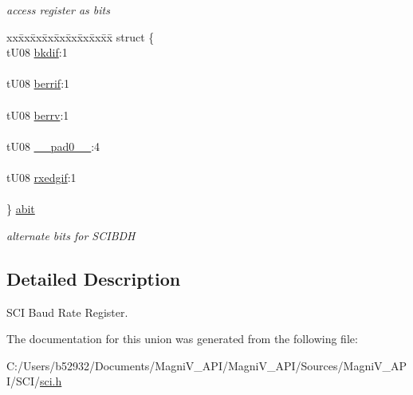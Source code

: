 \begin{DoxyCompactItemize}
\begin{tabbing}
\end{tabbing}\begin{DoxyCompactList}\small\item\em access register as bits \end{DoxyCompactList}\item 
\hypertarget{unionu_s_c_i_b_d_h_a577035baed3b5fcdcb15eea56205b567}{}\begin{tabbing}
xx\=xx\=xx\=xx\=xx\=xx\=xx\=xx\=xx\=\kill
struct \{\\
\>tU08 \hyperlink{unionu_s_c_i_b_d_h_ae49ce51a9e613e61b85a8d08e05ca972}{bkdif}:1\\
\>\\
\>tU08 \hyperlink{unionu_s_c_i_b_d_h_a31cd5bb70bc01ccdebdbfb70d4dbd71f}{berrif}:1\\
\>\\
\>tU08 \hyperlink{unionu_s_c_i_b_d_h_ad6b46bbe8d4087224f35a47a8bff6dd7}{berrv}:1\\
\>\\
\>tU08 \hyperlink{unionu_s_c_i_b_d_h_aa3e5250d311ceb1525f9adf38f0d7982}{\_\_pad0\_\_}:4\\
\>\\
\>tU08 \hyperlink{unionu_s_c_i_b_d_h_ae915416fcf85390ca0918f57902d3d84}{rxedgif}:1\\
\>\\
\} \hyperlink{unionu_s_c_i_b_d_h_a577035baed3b5fcdcb15eea56205b567}{abit}\label{unionu_s_c_i_b_d_h_a577035baed3b5fcdcb15eea56205b567}
\\

\end{tabbing}\begin{DoxyCompactList}\small\item\em alternate bits for S\+C\+I\+B\+D\+H \end{DoxyCompactList}\end{DoxyCompactItemize}


\subsection{Detailed Description}
S\+C\+I Baud Rate Register. 

The documentation for this union was generated from the following file\+:\begin{DoxyCompactItemize}
\item 
C\+:/\+Users/b52932/\+Documents/\+Magni\+V\+\_\+\+A\+P\+I/\+Magni\+V\+\_\+\+A\+P\+I/\+Sources/\+Magni\+V\+\_\+\+A\+P\+I/\+S\+C\+I/\hyperlink{sci_8h}{sci.\+h}\end{DoxyCompactItemize}
